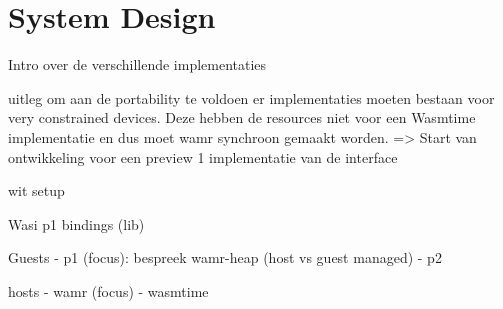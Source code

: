 \chapter{System Design}
\label{chap:3}


Intro over de verschillende implementaties

uitleg om aan de portability te voldoen er implementaties moeten bestaan voor very constrained devices. Deze hebben de resources niet voor een Wasmtime implementatie en dus moet wamr synchroon gemaakt worden.
=> Start van ontwikkeling voor een preview 1 implementatie van de interface

wit setup

Wasi p1 bindings (lib)

Guests
- p1 (focus): bespreek wamr-heap (host vs guest managed)
- p2

hosts
- wamr (focus)
- wasmtime

